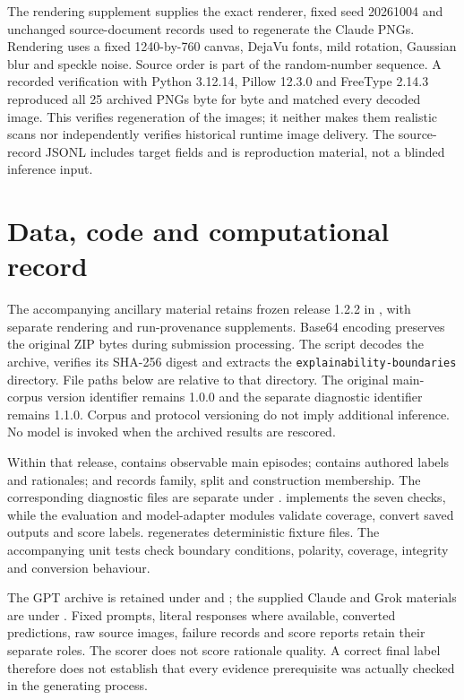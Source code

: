 The rendering supplement supplies the exact renderer, fixed seed 20261004 and unchanged source-document records used to regenerate the Claude PNGs. Rendering uses a fixed 1240-by-760 canvas, DejaVu fonts, mild rotation, Gaussian blur and speckle noise. Source order is part of the random-number sequence. A recorded verification with Python 3.12.14, Pillow 12.3.0 and FreeType 2.14.3 reproduced all 25 archived PNGs byte for byte and matched every decoded image. This verifies regeneration of the images; it neither makes them realistic scans nor independently verifies historical runtime image delivery. The source-record JSONL includes target fields and is reproduction material, not a blinded inference input.

\section{Data, code and computational record}
\label{app:artifacts}
\label{sec:supp-reproducibility}

The accompanying ancillary material retains frozen release 1.2.2 in , with separate rendering and run-provenance supplements. Base64 encoding preserves the original ZIP bytes during submission processing. The script  decodes the archive, verifies its SHA-256 digest and extracts the \texttt{explainability-boundaries} directory. File paths below are relative to that directory. The original main-corpus version identifier remains 1.0.0 and the separate diagnostic identifier remains 1.1.0. Corpus and protocol versioning do not imply additional inference. No model is invoked when the archived results are rescored.

Within that release,  contains observable main episodes;  contains authored labels and rationales; and  records family, split and construction membership. The corresponding diagnostic files are separate under .  implements the seven checks, while the evaluation and model-adapter modules validate coverage, convert saved outputs and score labels.  regenerates deterministic fixture files. The accompanying unit tests check boundary conditions, polarity, coverage, integrity and conversion behaviour.

The GPT archive is retained under  and ; the supplied Claude and Grok materials are under . Fixed prompts, literal responses where available, converted predictions, raw source images, failure records and score reports retain their separate roles. The scorer does not score rationale quality. A correct final label therefore does not establish that every evidence prerequisite was actually checked in the generating process.

